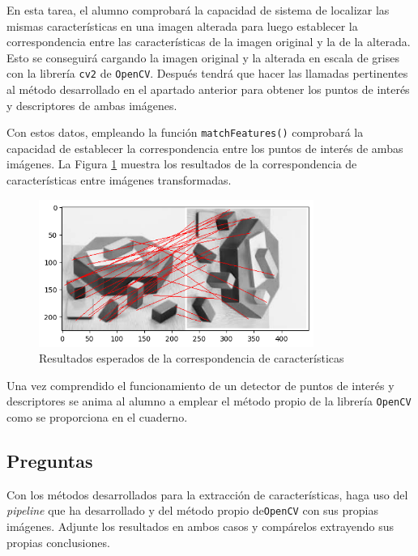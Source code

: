 En esta tarea, el alumno comprobará la capacidad de sistema de localizar las mismas características en una imagen alterada para luego establecer la correspondencia entre las características de la imagen original y la de la alterada. Esto se conseguirá cargando la imagen original y la alterada en escala de grises con la librería \texttt{cv2} de \texttt{OpenCV}. Después tendrá que hacer las llamadas pertinentes al método desarrollado en el apartado anterior para obtener los puntos de interés y descriptores de ambas imágenes. 

Con estos datos, empleando la función \texttt{matchFeatures()} comprobará la capacidad de establecer la correspondencia entre los puntos de interés de ambas imágenes. La Figura \ref{fig:FMatchEnd} muestra los resultados de la correspondencia de características entre imágenes transformadas.

\begin{figure}[h]
    \centering
    \includegraphics[width=0.8\textwidth]{Lab_3/template/figures/FeatureMatchMine.png}
    \caption{Resultados esperados de la correspondencia de características}
    \label{fig:FMatchEnd}
\end{figure}

Una vez comprendido el funcionamiento de un detector de puntos de interés y descriptores se anima al alumno a emplear el método propio de la librería \texttt{OpenCV} como se proporciona en el cuaderno.

\subsection*{Preguntas}

\vspace{5mm}
\begin{tcolorbox}[colback=gray!10, colframe=gray!30, coltitle=black, title=Pregunta C.1: Correspodencia de imágenes propias y evaluación, halign=left]
Con los métodos desarrollados para la extracción de características, haga uso del \textit{pipeline} que ha desarrollado y del método propio de\texttt{OpenCV} con sus propias imágenes. Adjunte los resultados en ambos casos y compárelos extrayendo sus propias conclusiones.
\end{tcolorbox}

